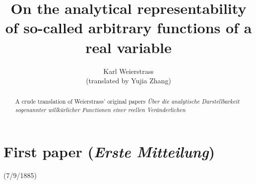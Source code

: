 \documentclass{article}
\title{On the analytical representability of so-called arbitrary functions of a real variable}
\author{Karl Weierstrass\\(translated by Yujia Zhang)}
\begin{document}
\maketitle
\begin{abstract} 
A crude translation of Weierstrass' original papers \textit{\"{U}ber die analytische Darstellbarkeit sogenannter willk\"{u}rlicher Functionen einer reellen Ver\"{a}nderlichen}
\end{abstract}


\section*{First paper (\textit{Erste Mitteilung})}

(7/9/1885)
\end{document}
